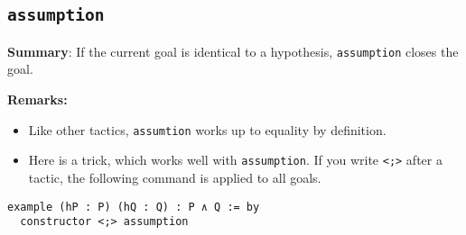 \documentclass{memoir}
\begin{document}
\subsection{\Verb|assumption|}

\textbf{Summary}: If the current goal is identical to a hypothesis, \Verb|assumption| closes the goal.

\textbf{Remarks:}

\begin{itemize}
\item Like other tactics, \Verb|assumtion| works up to equality by definition.\item Here is a trick, which works well with \Verb|assumption|. If you write \Verb|<;>| after a tactic, the following command is applied to all goals.
\end{itemize}


\begin{verbatim}
example (hP : P) (hQ : Q) : P ∧ Q := by
  constructor <;> assumption

\end{verbatim}
\end{document}
